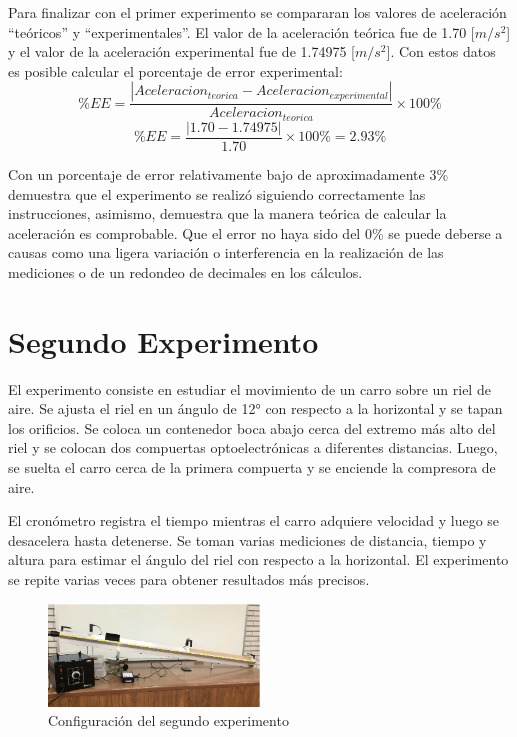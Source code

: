 \documentclass[12pt, titlepage]{report}
\begin{document}
    \newpage
    Para finalizar con el primer experimento se compararan los valores de aceleración ``teóricos'' y ``experimentales''. El valor de la aceleración teórica fue de 1.70 [$m/s^2$] y el valor de la aceleración experimental fue de 1.74975 [$m/s^2$]. Con estos datos es posible calcular el porcentaje de error experimental:
    $$\%EE=\frac{|Aceleracion_{teorica}-Aceleracion_{experimental}|}{Aceleracion_{teorica}}\times100\%$$
    $$\%EE=\frac{|1.70-1.74975|}{1.70}\times100\%=2.93\%$$

    Con un porcentaje de error relativamente bajo de aproximadamente 3\% demuestra que el experimento se realizó siguiendo correctamente las instrucciones, asimismo, demuestra que la manera teórica de calcular la aceleración es comprobable. Que el error no haya sido del 0\% se puede deberse a causas como una ligera variación o interferencia en la realización de las mediciones o de un redondeo de decimales en los cálculos.

    \section*{Segundo Experimento}
    El experimento consiste en estudiar el movimiento de un carro sobre un riel de aire. Se ajusta el riel en un ángulo de 12° con respecto a la horizontal y se tapan los orificios. Se coloca un contenedor boca abajo cerca del extremo más alto del riel y se colocan dos compuertas optoelectrónicas a diferentes distancias. Luego, se suelta el carro cerca de la primera compuerta y se enciende la compresora de aire. 
    
    El cronómetro registra el tiempo mientras el carro adquiere velocidad y luego se desacelera hasta detenerse. Se toman varias mediciones de distancia, tiempo y altura para estimar el ángulo del riel con respecto a la horizontal. El experimento se repite varias veces para obtener resultados más precisos.

    \begin{figure}[ht]
        \centering
        \includegraphics[width=0.5\textwidth]{Rampa_Exp2.png}
        \caption{Configuración del segundo experimento}
    \end{figure}
    
\end{document}
